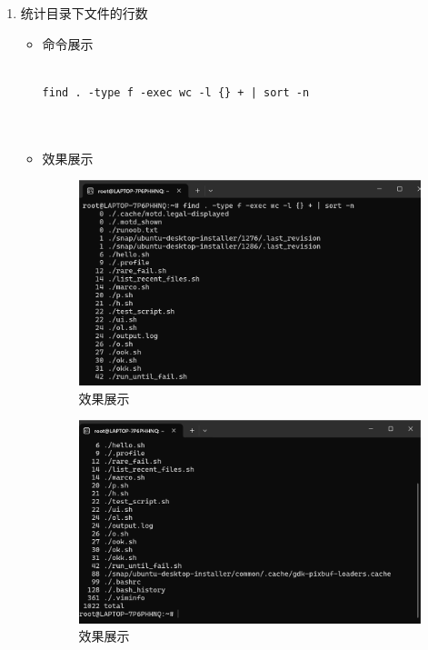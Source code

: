 \documentclass[UTF8]{ctexart}
\begin{document}
\begin{enumerate}
  \item 统计目录下文件的行数
  \begin{itemize}
  \item 命令展示
  \begin{verbatim}

find . -type f -exec wc -l {} + | sort -n

    
  \end{verbatim}

  \item 效果展示
  \begin{figure}[H]
    \centering
    \includegraphics[width=\textwidth]{15}

    \caption{效果展示}
  
  \end{figure}
\begin{figure}[H]
    \centering
  
   \includegraphics[width=\textwidth]{151}  %
    \caption{效果展示}
  
  \end{figure}
\end{itemize}
\end{enumerate}
\end{document}
